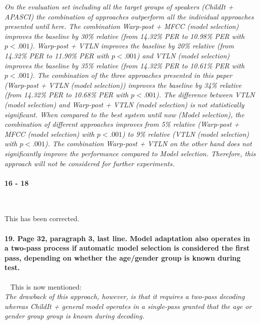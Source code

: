 \documentclass[]{article}
\begin{document}
\textit{On the evaluation set including all the target groups of speakers (ChildIt + APASCI) the combination of approaches outperform all the individual approaches presented until here. The combination {\em Warp-post + MFCC (model selection)} improves the baseline by 30\% relative (from 14.32\% PER to 10.98\% PER with $p  <.001$).  {\em Warp-post + VTLN} improves the baseline by 20\% relative (from 14.32\% PER to 11.90\% PER with $p  <.001$) and {\em VTLN (model selection)} improves the baseline by 35\% relative (from 14.32\% PER to 10.61\% PER with $p  <.001$). The combination of the three approaches presented in this paper ({\em Warp-post + VTLN (model selection)}) improves the baseline by 34\% relative (from 14.32\% PER to 10.68\% PER with $p  <.001$). The difference between {\em VTLN (model selection)} and {\em Warp-post + VTLN (model selection)} is not statistically significant. When compared to the best system until now ({\em Model selection}), the combination of different approaches improves from 5\% relative ({\em Warp-post + MFCC (model selection)} with $p  <.001$) to 9\% relative ({\em VTLN (model selection)} with $p  <.001$). The combination {\em Warp-post + VTLN} on the other hand does not significantly improve the performance compared to {\em Model selection}. Therefore, this approach will not be considered for further experiments.}


\paragraph{16 - 18}

~

This has been corrected.

\paragraph{19. Page 32, paragraph 3, last line. Model adaptation also operates in a two-pass process if automatic model selection is considered the first pass, depending on whether the age/gender group is known during test.}

~
This is now mentioned:\\
\textit{The drawback of this approach, however, is that it requires a two-pass decoding whereas {\em ChildIt + general model} operates in a single-pass granted that the age or gender group group is known during decoding.}
\end{document}
